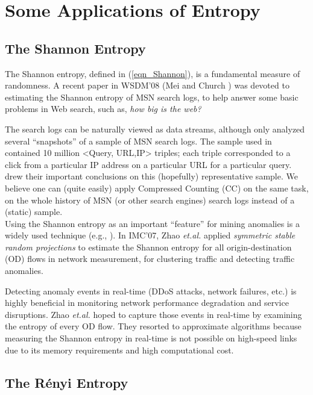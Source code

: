 \documentclass{sig-alternate}
\begin{document}
\section{Some Applications of Entropy}\label{sec_entropy}

\subsection{The Shannon Entropy}

The Shannon entropy,  defined in (\ref{eqn_Shannon}), is a fundamental measure of randomness. A recent paper in WSDM'08 (Mei and Church \cite{Proc:Mei_WSDM08}) was devoted to estimating the Shannon entropy of MSN search logs, to help answer some basic problems in Web search, such as,  {\em how big is the web?}

The search logs can be naturally viewed as data streams, although \cite{Proc:Mei_WSDM08} only analyzed several ``snapshots'' of a sample of MSN search logs.  The sample used in \cite{Proc:Mei_WSDM08} contained 10 million <Query, URL,IP> triples; each triple corresponded to a click from a particular IP address on a particular URL for a particular query.  \cite{Proc:Mei_WSDM08} drew their important conclusions on this (hopefully) representative sample. We believe one can (quite easily) apply Compressed Counting (CC) on the same task, on the whole history of MSN (or other search engines) search logs instead of a (static) sample.\\


Using the Shannon entropy as an important ``feature'' for mining anomalies is a widely used technique (e.g., \cite{Proc:Lakhina_SIGCOMM05}). In IMC'07, Zhao {\it et.al.}\cite{Proc:Zhao_IMC07} applied {\em symmetric stable random projections} to estimate the Shannon entropy for all origin-destination (OD) flows in network measurement, for clustering traffic and detecting traffic anomalies.

Detecting anomaly events in real-time (DDoS attacks, network failures, etc.) is highly beneficial in monitoring network performance degradation and service disruptions. Zhao {\it et.al.}\cite{Proc:Zhao_IMC07}  hoped to capture those events in real-time by examining the entropy of every OD flow.  They resorted to approximate algorithms because measuring the Shannon entropy in real-time is not possible on high-speed links due to its memory requirements and high computational cost.\\


\subsection{The R\'enyi Entropy}
\end{document}
